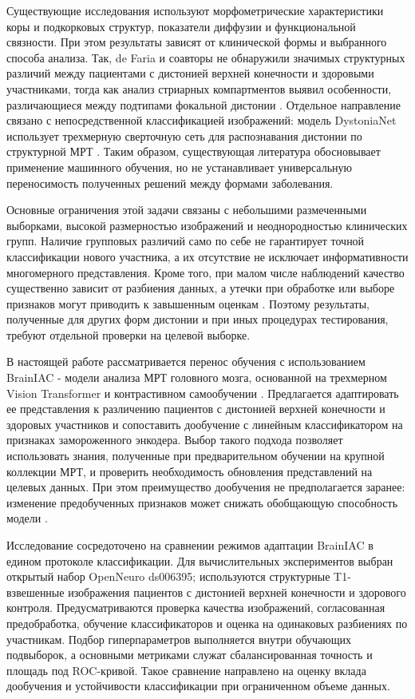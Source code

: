 \documentclass[11pt,a4paper]{article}
\begin{document}
Существующие исследования используют морфометрические характеристики коры и подкорковых структур, показатели диффузии и функциональной связности. При этом результаты зависят от клинической формы и выбранного способа анализа. Так, de Faria и соавторы \cite{ref01} не обнаружили значимых структурных различий между пациентами с дистонией верхней конечности и здоровыми участниками, тогда как анализ стриарных компартментов выявил особенности, различающиеся между подтипами фокальной дистонии \cite{ref03}. Отдельное направление связано с непосредственной классификацией изображений: модель DystoniaNet использует трехмерную сверточную сеть для распознавания дистонии по структурной МРТ \cite{ref06}. Таким образом, существующая литература обосновывает применение машинного обучения, но не устанавливает универсальную переносимость полученных решений между формами заболевания.

Основные ограничения этой задачи связаны с небольшими размеченными выборками, высокой размерностью изображений и неоднородностью клинических групп. Наличие групповых различий само по себе не гарантирует точной классификации нового участника, а их отсутствие не исключает информативности многомерного представления. Кроме того, при малом числе наблюдений качество существенно зависит от разбиения данных, а утечки при обработке или выборе признаков могут приводить к завышенным оценкам \cite{ref20,ref22}. Поэтому результаты, полученные для других форм дистонии и при иных процедурах тестирования, требуют отдельной проверки на целевой выборке.

В настоящей работе рассматривается перенос обучения с использованием BrainIAC - модели анализа МРТ головного мозга, основанной на трехмерном Vision Transformer и контрастивном самообучении \cite{ref09}. Предлагается адаптировать ее представления к различению пациентов с дистонией верхней конечности и здоровых участников и сопоставить дообучение с линейным классификатором на признаках замороженного энкодера. Выбор такого подхода позволяет использовать знания, полученные при предварительном обучении на крупной коллекции МРТ, и проверить необходимость обновления представлений на целевых данных. При этом преимущество дообучения не предполагается заранее: изменение предобученных признаков может снижать обобщающую способность модели \cite{ref19}.

Исследование сосредоточено на сравнении режимов адаптации BrainIAC в едином протоколе классификации. Для вычислительных экспериментов выбран открытый набор OpenNeuro ds006395; используются структурные T1-взвешенные изображения пациентов с дистонией верхней конечности и здорового контроля. Предусматриваются проверка качества изображений, согласованная предобработка, обучение классификаторов и оценка на одинаковых разбиениях по участникам. Подбор гиперпараметров выполняется внутри обучающих подвыборок, а основными метриками служат сбалансированная точность и площадь под ROC-кривой. Такое сравнение направлено на оценку вклада дообучения и устойчивости классификации при ограниченном объеме данных.
\end{document}
